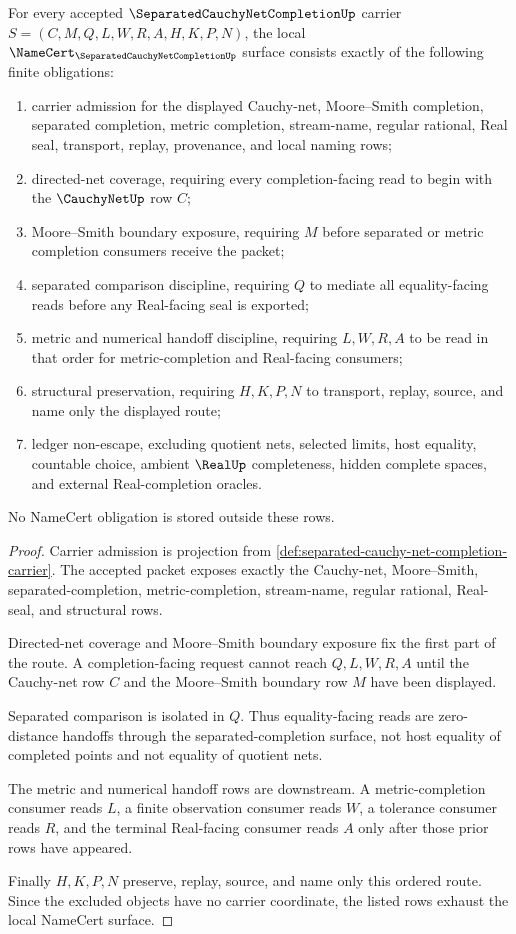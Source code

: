 \begin{theorem}
\label{thm:separated-cauchy-net-completion-namecert-obligations}
For every accepted $\SeparatedCauchyNetCompletionUp$ carrier $S=(C,M,Q,L,W,R,A,H,K,P,N)$, the local $\NameCert_{\SeparatedCauchyNetCompletionUp}$ surface consists exactly of the following finite obligations:
\begin{enumerate}
\item carrier admission for the displayed Cauchy-net, Moore--Smith completion, separated completion, metric completion, stream-name, regular rational, Real seal, transport, replay, provenance, and local naming rows;
\item directed-net coverage, requiring every completion-facing read to begin with the $\CauchyNetUp$ row $C$;
\item Moore--Smith boundary exposure, requiring $M$ before separated or metric completion consumers receive the packet;
\item separated comparison discipline, requiring $Q$ to mediate all equality-facing reads before any Real-facing seal is exported;
\item metric and numerical handoff discipline, requiring $L,W,R,A$ to be read in that order for metric-completion and Real-facing consumers;
\item structural preservation, requiring $H,K,P,N$ to transport, replay, source, and name only the displayed route;
\item ledger non-escape, excluding quotient nets, selected limits, host equality, countable choice, ambient $\RealUp$ completeness, hidden complete spaces, and external Real-completion oracles.
\end{enumerate}
No NameCert obligation is stored outside these rows.
\end{theorem}
\begin{proof}
Carrier admission is projection from \autoref{def:separated-cauchy-net-completion-carrier}. The accepted packet exposes exactly the Cauchy-net, Moore--Smith, separated-completion, metric-completion, stream-name, regular rational, Real-seal, and structural rows.

Directed-net coverage and Moore--Smith boundary exposure fix the first part of the route. A completion-facing request cannot reach $Q,L,W,R,A$ until the Cauchy-net row $C$ and the Moore--Smith boundary row $M$ have been displayed.

Separated comparison is isolated in $Q$. Thus equality-facing reads are zero-distance handoffs through the separated-completion surface, not host equality of completed points and not equality of quotient nets.

The metric and numerical handoff rows are downstream. A metric-completion consumer reads $L$, a finite observation consumer reads $W$, a tolerance consumer reads $R$, and the terminal Real-facing consumer reads $A$ only after those prior rows have appeared.

Finally $H,K,P,N$ preserve, replay, source, and name only this ordered route. Since the excluded objects have no carrier coordinate, the listed rows exhaust the local NameCert surface.
\end{proof}

